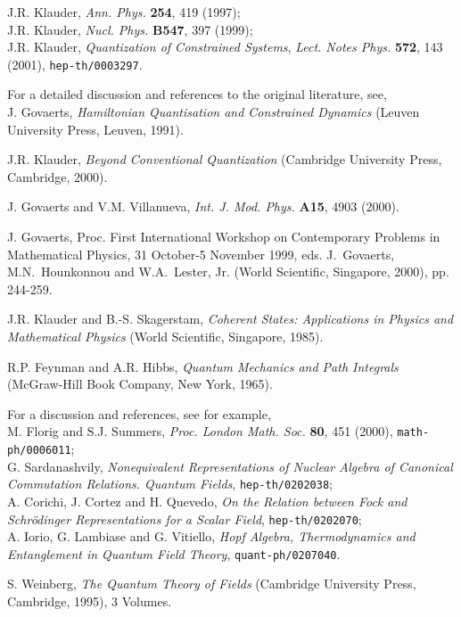 \documentclass[a4paper,11pt]{article}
\begin{document}
\begin{thebibliography}{99}
J.R. Klauder, {\em Ann. Phys.\/} {\bf 254}, 419 (1997);\\
J.R. Klauder, {\em Nucl. Phys.\/} {\bf B547}, 397 (1999);\\
J.R. Klauder, {\sl Quantization of Constrained Systems\/},
{\sl Lect. Notes Phys.\/} {\bf 572}, 143 (2001), {\tt hep-th/0003297}.

 For a detailed discussion and references to the
original literature, see,\\
J. Govaerts, {\sl Hamiltonian Quantisation and Constrained Dynamics\/}
(Leuven University Press, Leuven, 1991).

 J.R. Klauder, {\sl Beyond Conventional Quantization\/}
(Cambridge University Press, Cambridge, 2000).

 J. Govaerts and V.M. Villanueva, {\em Int. J. Mod. Phys.\/} 
{\bf A15}, 4903 (2000).

 J. Govaerts, Proc. First International
Workshop on Contemporary Pro\-blems in Mathematical Physics, 
31 October-5 November
1999, eds. J.~Govaerts, M.N.~Hounkonnou and W.A.~Lester, Jr. (World Scientific,
Singapore, 2000), pp. 244-259.

J.R. Klauder and B.-S. Skagerstam, {\sl Coherent States: Applications in
Physics and Mathe\-ma\-ti\-cal Physics\/} (World Scientific, Singapore, 1985).

 R.P. Feynman and A.R. Hibbs, {\sl Quantum Mechanics and 
Path Integrals\/} (McGraw-Hill Book Company, New York, 1965).

 For a discussion and references, see for example,\\
M. Florig and S.J. Summers, {\em Proc. London Math. Soc.\/} {\bf 80}, 451 (2000),
{\tt math-ph/0006011};\\
G. Sardanashvily, {\sl Nonequivalent Representations of Nuclear Algebra of
Canonical Commutation Relations. Quantum Fields\/}, {\tt hep-th/0202038};\\
A. Corichi, J. Cortez and H. Quevedo, {\sl On the Relation between Fock and
Schr\"odinger Representations for a Scalar Field\/}, {\tt hep-th/0202070};\\
A. Iorio, G. Lambiase and G. Vitiello, {\sl Hopf Algebra, Thermodynamics
and Entanglement in Quantum Field Theory\/}, {\tt quant-ph/0207040}.

 S. Weinberg, {\sl The Quantum Theory of Fields\/}
(Cambridge University Press, Cambridge, 1995), 3 Volumes.


\end{thebibliography}
\end{document}
